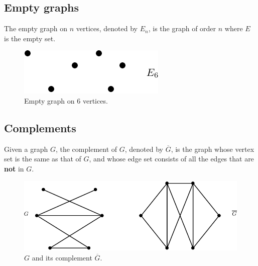 \documentclass[12pt,a4paper]{article}
\theoremstyle{definition}
\begin{document}
\subsection{Empty graphs}
The empty graph on $n$ vertices, denoted by $E_n$, is the graph of order $n$ where $E$ is the empty set.
\begin{figure}[hbtp]
\centering
\includegraphics[scale=.8]{images/graph10.pdf}
\caption{Empty graph on $6$ vertices.}
\end{figure}
\subsection{Complements}
Given a graph $G$, the complement of $G$,  denoted by $\overline{G}$, is the graph whose vertex set is the same as that of $G$, and whose edge set consists of all the edges that are \textbf{not} in $G$.
\begin{figure}[hbtp]
\centering
\includegraphics[scale=.7]{images/graph11.pdf}
\caption{$G$ and its complement $\overline{G}$.}
\end{figure}
\newpage
\end{document}

